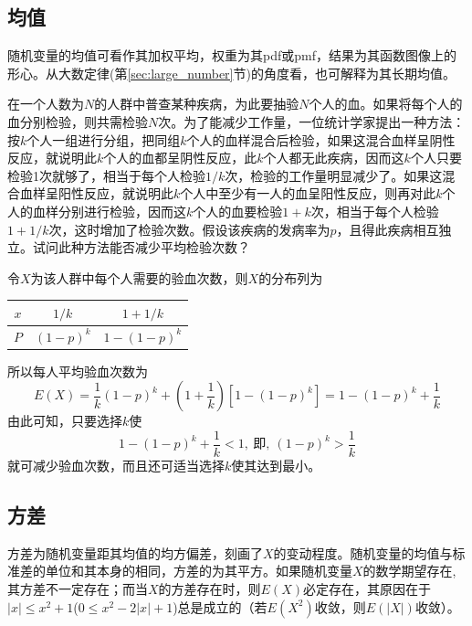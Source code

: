 \subsection{均值}

随机变量的均值可看作其加权平均，权重为其pdf或pmf，结果为其函数图像上的形心。从大数定律(第\ref{sec:large_number}节)的角度看，也可解释为其长期均值。

\begin{example}
    在一个人数为$N$的人群中普查某种疾病，为此要抽验$N$个人的血。如果将每个人的血分别检验，则共需检验$N$次。为了能减少工作量，一位统计学家提出一种方法：按$k$个人一组进行分组，把同组$k$个人的血样混合后检验，如果这混合血样呈阴性反应，就说明此$k$个人的血都呈阴性反应，此$k$个人都无此疾病，因而这$k$个人只要检验1次就够了，相当于每个人检验$1/k$次，检验的工作量明显减少了。如果这混合血样呈阳性反应，就说明此$k$个人中至少有一人的血呈阳性反应，则再对此$k$个人的血样分别进行检验，因而这$k$个人的血要检验$1+k$次，相当于每个人检验$1+1/k$次，这时增加了检验次数。假设该疾病的发病率为$p$，且得此疾病相互独立。试问此种方法能否减少平均检验次数？
\end{example}
\begin{solution}
    令$X$为该人群中每个人需要的验血次数，则$X$的分布列为
    \begin{table}[htbp]
        \centering
        \begin{tabular}{c|cc}
            $x$ & $1 / k$   & $1+1 / k$   \\\midrule
            $P$ & $(1-p)^k$ & $1-(1-p)^k$ \\
        \end{tabular}
    \end{table}
    所以每人平均验血次数为
    \[ E(X)=\frac1{k}(1-p)^k+(1+\frac1{k})[1-(1-p)^k]=1-(1-p)^k+\frac1{k} \]
    由此可知，只要选择$k$使
    \[ 1-(1-p)^k+\frac1{k}<1,\ \text{即} ,\ (1-p)^k>\frac1{k} \]
    就可减少验血次数，而且还可适当选择$k$使其达到最小。
\end{solution}

\subsection{方差}

方差为随机变量距其均值的均方偏差，刻画了$X$的变动程度。随机变量的均值与标准差的单位和其本身的相同，方差的为其平方。如果随机变量$X$的数学期望存在, 其方差不一定存在；而当$X$的方差存在时，则$E(X)$必定存在，其原因在于$|x| \le x^2+1$($0 \le x^2-2|x|+1$)总是成立的（若$E(X^2)$收敛，则$E(|X|)$收敛）。

